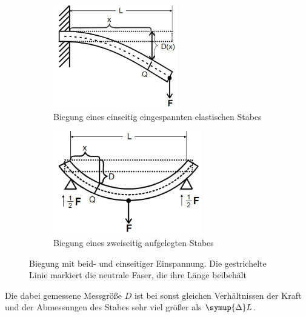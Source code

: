 \begin{figure}
    \begin{subfigure}{0.48\textwidth}
        \centering
        \caption{Biegung eines einseitig eingespannten elastischen Stabes}
        \label{fig:eins}
        \includegraphics[height=4.5cm]{pics/eins.png}
    \end{subfigure}
    \begin{subfigure}{0.48\textwidth}
        \centering
        \caption{Biegung eines zweiseitig aufgelegten Stabes}
        \label{fig:zwei}
        \includegraphics[height=4.5cm]{pics/zwei.png}
    \end{subfigure}
    \caption{Biegung mit beid- und einseitiger Einspannung.
    Die gestrichelte Linie markiert die neutrale Faser, die ihre Länge beibehält \cite{v103}}
    \label{fig:drei}
\end{figure}
Die dabei gemessene Messgröße $D$ ist bei sonst gleichen Verhältnissen der Kraft und der Abmessungen des Stabes sehr viel größer als $\symup{\Delta}L$.
